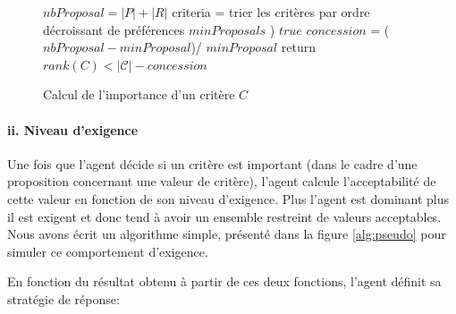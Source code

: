 	\begin{figure}[h]
		\caption{\label{alg:important} Calcul de l'importance d'un critère $C$}
		\begin{algorithmic}[1]
			\State $nbProposal = |P| + |R|$ 
			\State criteria = trier les critères par ordre décroissant de préférences
			\State $minProposals$ 
			) 
			\State $true$ 
			\Else
			\State $concession $ = ($nbProposal - minProposal$)/ $minProposal$
			\State return $rank(C) < |\mathcal{C}| - concession$
			\EndIf 
			\EndFunction
		\end{algorithmic}
	\end{figure}
	
	\paragraph{ii. Niveau d'exigence}
		Une fois que l'agent décide si un critère est important (dans le cadre d'une proposition concernant une valeur de critère), l'agent calcule l'acceptabilité de cette valeur en fonction de son niveau d'exigence. Plus l'agent est dominant plus il est exigent et donc tend à avoir un ensemble restreint de valeurs acceptables. Nous avons écrit un algorithme simple, présenté dans la figure \ref{alg:pseudo} pour simuler ce comportement d'exigence. 
	
	En fonction du résultat obtenu à partir de ces deux fonctions, l'agent définit sa stratégie de réponse: 
	
